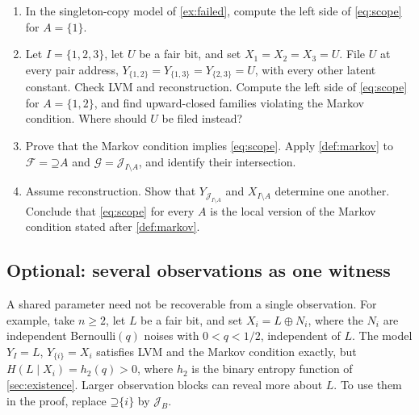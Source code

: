 \documentclass[11pt]{article}
\newcommand{\Up}{\mathord{\supseteq}}
\begin{document}
\begin{exercise}
\label{ex:scope}\important
\begin{enumerate}
\item In the singleton-copy model of \cref{ex:failed}, compute the left side
of \eqref{eq:scope} for $A=\{1\}$.
\item Let $I=\{1,2,3\}$, let $U$ be a fair bit, and set $X_1=X_2=X_3=U$. File
$U$ at every pair address, $Y_{\{1,2\}}=Y_{\{1,3\}}=Y_{\{2,3\}}=U$, with every
other latent constant. Check LVM and reconstruction. Compute the left side of
\eqref{eq:scope} for $A=\{1,2\}$, and find upward-closed families violating
the Markov condition. Where should $U$ be filed instead?
\item Prove that the Markov condition implies \eqref{eq:scope}. Apply
\cref{def:markov} to $\mathcal{F}=\Up A$ and $\mathcal{G}=\mathcal{J}_{I\setminus A}$,
and identify their intersection.
\item Assume reconstruction. Show that $Y_{\mathcal{J}_{I\setminus A}}$ and
$X_{I\setminus A}$ determine one another. Conclude that \eqref{eq:scope} for
every $A$ is the local version of the Markov condition stated after
\cref{def:markov}.
\end{enumerate}
\end{exercise}

\subsection{Optional: several observations as one witness}
\label{sec:blocks}
A shared parameter need not be recoverable from a single observation. For
example, take $n\ge2$, let $L$ be a fair bit, and set
$X_i=L\mathbin{\oplus}N_i$, where the
$N_i$ are independent Bernoulli$(q)$ noises with $0<q<1/2$, independent of
$L$. The model $Y_I=L$, $Y_{\{i\}}=X_i$ satisfies LVM and the
Markov condition exactly, but $H(L\mid X_i)=h_2(q)>0$, where
$h_2$ is the binary entropy function of \cref{sec:existence}.
Larger observation blocks can reveal more about $L$. To use them in the proof,
replace $\Up\{i\}$ by $\mathcal{J}_B$.
\end{document}
